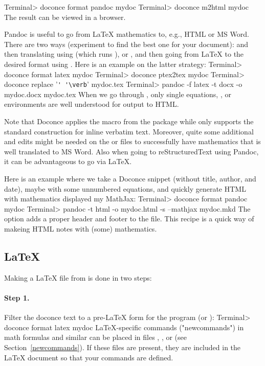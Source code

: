 \documentclass[%
oneside,                 %
final,                   %
10pt]{article}
\begin{document}
\bsys
Terminal> doconce format pandoc mydoc
Terminal> doconce m2html mydoc
\esys
The result  can be viewed in a browser.

Pandoc is useful to go from {\LaTeX} mathematics to, e.g., HTML or MS
Word.  There are two ways (experiment to find the best one for your
document):  and then translating using  (which runs ), or , and then
going from {\LaTeX} to the desired format using .
Here is an example on the latter strategy:
\bsys
Terminal> doconce format latex mydoc
Terminal> doconce ptex2tex mydoc
Terminal> doconce replace '\Verb!' '\verb!' mydoc.tex
Terminal> pandoc -f latex -t docx -o mydoc.docx mydoc.tex
\esys
When we go through , only single equations, , or 
environments are well understood for output to HTML.

Note that Doconce applies the  macro from the  package
while  only supports the standard  construction for
inline verbatim text.  Moreover, quite some additional  and  edits might be needed on the  or
 files to successfully have mathematics that is well translated
to MS Word.  Also when going to reStructuredText using Pandoc, it can
be advantageous to go via {\LaTeX}.

Here is an example where we take a Doconce snippet (without title, author,
and date), maybe with some unnumbered equations, and quickly generate
HTML with mathematics displayed my MathJax:
\bsys
Terminal> doconce format pandoc mydoc
Terminal> pandoc -t html -o mydoc.html -s --mathjax mydoc.mkd
\esys
The  option adds a proper header and footer to the  file.
This recipe is a quick way of makeing HTML notes with (some) mathematics.


\subsection{{\LaTeX}}

Making a {\LaTeX} file  from  is done in two steps:

\paragraph{Step 1.}
Filter the doconce text to a pre-LaTeX form  for
the  program (or ):
\bsys
Terminal> doconce format latex mydoc
\esys
LaTeX-specific commands ("newcommands") in math formulas and similar
can be placed in files , , or
 (see Section~\ref{newcommands}).
If these files are present, they are included in the {\LaTeX} document
so that your commands are defined.
\end{document}
